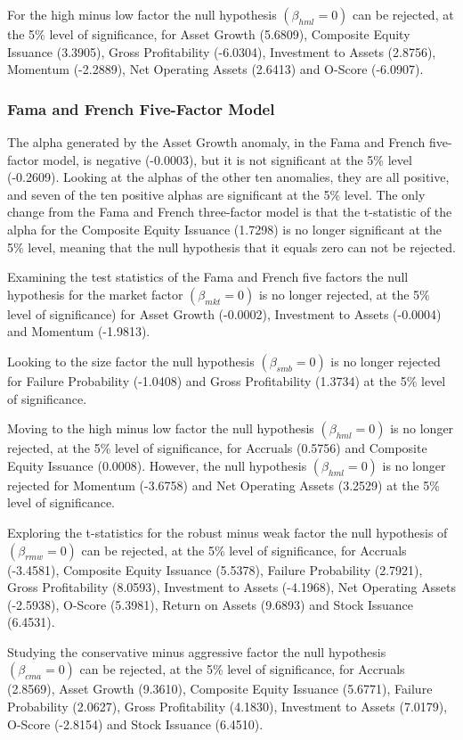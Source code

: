\documentclass[a4paper,12pt]{article}                 %
\begin{document}
For the high minus low factor the null hypothesis $(\beta_{hml}= 0)$ can be rejected, at the 5\% level of significance, for Asset Growth (5.6809), Composite Equity Issuance (3.3905), Gross Profitability (-6.0304), Investment to Assets (2.8756), Momentum (-2.2889), Net Operating Assets (2.6413) and O-Score (-6.0907).

\subsubsection{Fama and French Five-Factor Model}
The alpha generated by the Asset Growth anomaly, in the Fama and French five-factor model, is negative (-0.0003), but it is not significant at the 5\% level (-0.2609). Looking at the alphas of the other ten anomalies, they are all positive, and seven of the ten positive alphas are significant at the 5\% level. The only change from the Fama and French three-factor model is that the t-statistic of the alpha for the Composite Equity Issuance (1.7298) is no longer significant at the 5\% level, meaning that the null hypothesis that it equals zero can not be rejected.

Examining the test statistics of the Fama and French five factors the null hypothesis for the market factor $(\beta_{mkt}= 0)$ is no longer rejected, at the 5\% level of significance) for Asset Growth (-0.0002), Investment to Assets (-0.0004) and Momentum (-1.9813). 

Looking to the size factor the null hypothesis $(\beta_{smb}= 0)$ is no longer rejected for Failure Probability (-1.0408) and Gross Profitability (1.3734) at the 5\% level of significance.

Moving to the high minus low factor the null hypothesis $(\beta_{hml}= 0)$ is no longer rejected, at the 5\% level of significance, for Accruals (0.5756) and Composite Equity Issuance (0.0008). However, the null hypothesis $(\beta_{hml}= 0)$ is no longer rejected for Momentum (-3.6758) and Net Operating Assets (3.2529) at the 5\% level of significance.

Exploring the t-statistics for the robust minus weak factor the null hypothesis of $(\beta_{rmw}= 0)$ can be rejected, at the 5\% level of significance, for Accruals (-3.4581), Composite Equity Issuance (5.5378), Failure Probability (2.7921), Gross Profitability (8.0593), Investment to Assets (-4.1968), Net Operating Assets (-2.5938), O-Score (5.3981), Return on Assets (9.6893) and Stock Issuance (6.4531).

Studying the conservative minus aggressive factor the null hypothesis $(\beta_{cma}= 0)$ can be rejected, at the 5\% level of significance, for Accruals (2.8569), Asset Growth (9.3610), Composite Equity Issuance (5.6771), Failure Probability (2.0627), Gross Profitability (4.1830), Investment to Assets (7.0179), O-Score (-2.8154) and Stock Issuance (6.4510).
\end{document}
